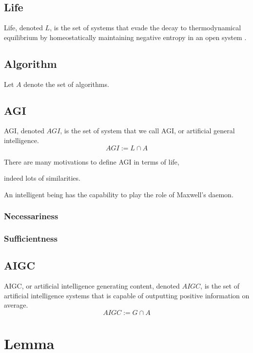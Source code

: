 \documentclass[12pt,amsmath,amsfonts,twocolumn]{revtex4-1}
\numberwithin{equation}{section}
\begin{document}
\subsection{Life}
Life, denoted $L$, is the set of systems that evade the decay to thermodynamical equilibrium by homeostatically maintaining negative entropy in an open system \cite{schrodinger_life}.

\subsection{Algorithm}
Let $A$ denote the set of algorithms. 

\subsection{AGI}
AGI, denoted $AGI$, is the set of system that we call AGI, or artificial general intelligence. 
\begin{equation}
AGI := L \cap A
\end{equation}

There are many motivations to define AGI in terms of life, 

indeed lots of similarities. 

An intelligent being has the capability to play the role of Maxwell's daemon\cite{deamon}. 


\subsubsection{Necessariness}
\subsubsection{Sufficientness}

\subsection{AIGC}
AIGC, or artificial intelligence generating content, denoted $AIGC$, is the set of artificial intelligence systems that is capable of outputting positive information on average.
\begin{equation}
AIGC := G \cap A
\end{equation}



\section{Lemma}
\end{document}
